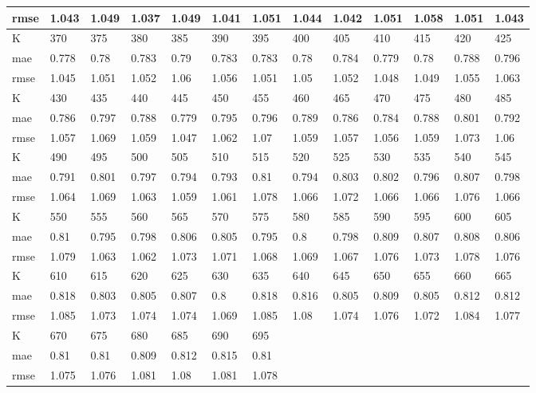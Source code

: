 \begin{appendices}
\begin{center}
\begin{tabularx}{\textwidth}{|l|X|X|X|X|X|X|X|X|X|X|X|X|}
		rmse & 1.043 & 1.049 & 1.037 & 1.049 & 1.041 & 1.051 & 1.044 & 1.042 & 1.051 & 1.058 & 1.051 & 1.043 \\ \hline 
		\hline 
		K & 370 & 375 & 380 & 385 & 390 & 395 & 400 & 405 & 410 & 415 & 420 & 425 \\ \hline 
		mae & 0.778 & 0.78 & 0.783 & 0.79 & 0.783 & 0.783 & 0.78 & 0.784 & 0.779 & 0.78 & 0.788 & 0.796 \\ \hline 
		rmse & 1.045 & 1.051 & 1.052 & 1.06 & 1.056 & 1.051 & 1.05 & 1.052 & 1.048 & 1.049 & 1.055 & 1.063 \\ \hline 
		\hline 
		K & 430 & 435 & 440 & 445 & 450 & 455 & 460 & 465 & 470 & 475 & 480 & 485 \\ \hline 
		mae & 0.786 & 0.797 & 0.788 & 0.779 & 0.795 & 0.796 & 0.789 & 0.786 & 0.784 & 0.788 & 0.801 & 0.792 \\ \hline 
		rmse & 1.057 & 1.069 & 1.059 & 1.047 & 1.062 & 1.07 & 1.059 & 1.057 & 1.056 & 1.059 & 1.073 & 1.06 \\ \hline 
		\hline 
		K & 490 & 495 & 500 & 505 & 510 & 515 & 520 & 525 & 530 & 535 & 540 & 545 \\ \hline 
		mae & 0.791 & 0.801 & 0.797 & 0.794 & 0.793 & 0.81 & 0.794 & 0.803 & 0.802 & 0.796 & 0.807 & 0.798 \\ \hline 
		rmse & 1.064 & 1.069 & 1.063 & 1.059 & 1.061 & 1.078 & 1.066 & 1.072 & 1.066 & 1.066 & 1.076 & 1.066 \\ \hline 
		\hline 
		K & 550 & 555 & 560 & 565 & 570 & 575 & 580 & 585 & 590 & 595 & 600 & 605 \\ \hline 
		mae & 0.81 & 0.795 & 0.798 & 0.806 & 0.805 & 0.795 & 0.8 & 0.798 & 0.809 & 0.807 & 0.808 & 0.806 \\ \hline 
		rmse & 1.079 & 1.063 & 1.062 & 1.073 & 1.071 & 1.068 & 1.069 & 1.067 & 1.076 & 1.073 & 1.078 & 1.076 \\ \hline 
		\hline 
		K & 610 & 615 & 620 & 625 & 630 & 635 & 640 & 645 & 650 & 655 & 660 & 665 \\ \hline 
		mae & 0.818 & 0.803 & 0.805 & 0.807 & 0.8 & 0.818 & 0.816 & 0.805 & 0.809 & 0.805 & 0.812 & 0.812 \\ \hline 
		rmse & 1.085 & 1.073 & 1.074 & 1.074 & 1.069 & 1.085 & 1.08 & 1.074 & 1.076 & 1.072 & 1.084 & 1.077 \\ \hline 
		\hline 
		K & 670 & 675 & 680 & 685 & 690 & 695  & & & & & & \\ \hline 
		mae & 0.81 & 0.81 & 0.809 & 0.812 & 0.815 & 0.81 & & & & & &  \\ \hline 
		rmse & 1.075 & 1.076 & 1.081 & 1.08 & 1.081 & 1.078  & & & & & & \\ \hline 
	\end{tabularx} 
\end{center}

\end{appendices}

